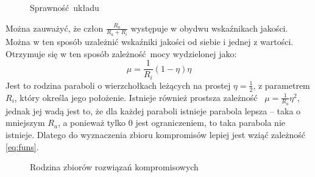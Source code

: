 \documentclass[a4paper, 12pt]{article}
\begin{document}
            \begin{figure}[H]
                \centering
                \def \svgwidth{0.7\columnwidth}
                
                \caption{Sprawność układu}
            \end{figure}\noindent
            Można zauważyć, że człon $\frac{R_a}{R_a + R_i}$ występuje w obydwu wskaźnikach jakości.
            Można w ten sposób uzależnić wskaźniki jakości od siebie i jednej z wartości. Otrzymuje
            się w ten sposób zależność mocy wydzielonej jako:
            \begin{equation}
                \mu = \frac{1}{R_i} (1 - \eta) \eta
                \label{eq:funs}
            \end{equation}
            Jest to rodzina paraboli o wierzchołkach leżących na prostej $\eta = \frac{1}{2}$, 
            z parametrem $R_i$, który określa jego położenie. Istnieje również prostsza zależność 
            $\mu = \frac{1}{R_a}\eta^2$, jednak jej wadą jest to, że dla każdej paraboli istnieje
            parabola lepsza -- taka o mniejszym $R_a$, a ponieważ tylko 0 jest ograniczeniem, to 
            taka parabola nie istnieje. Dlatego do wyznaczenia zbioru kompromisów lepiej jest
            wziąć zależność \ref{eq:funs}.
            \begin{figure}[H]
                \centering
                \def \svgwidth{0.7\columnwidth}
                
                \caption{Rodzina zbiorów rozwiązań kompromisowych}
            \end{figure}\noindent
\end{document}
